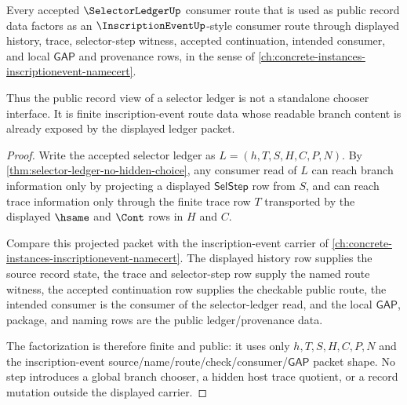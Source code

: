 \begin{theorem}
\label{thm:selector-ledger-inscription-event-consumer-route}
Every accepted $\SelectorLedgerUp$ consumer route that is used as public record data factors as an $\InscriptionEventUp$-style consumer route through displayed history, trace, selector-step witness, accepted continuation, intended consumer, and local $\mathsf{GAP}$ and provenance rows, in the sense of \autoref{ch:concrete-instances-inscriptionevent-namecert}.

Thus the public record view of a selector ledger is not a standalone chooser interface. It is finite inscription-event route data whose readable branch content is already exposed by the displayed ledger packet.
\end{theorem}
\begin{proof}
Write the accepted selector ledger as $L=(h,T,S,H,C,P,N)$. By \autoref{thm:selector-ledger-no-hidden-choice}, any consumer read of $L$ can reach branch information only by projecting a displayed $\mathsf{SelStep}$ row from $S$, and can reach trace information only through the finite trace row $T$ transported by the displayed $\hsame$ and $\Cont$ rows in $H$ and $C$.

Compare this projected packet with the inscription-event carrier of \autoref{ch:concrete-instances-inscriptionevent-namecert}. The displayed history row supplies the source record state, the trace and selector-step row supply the named route witness, the accepted continuation row supplies the checkable public route, the intended consumer is the consumer of the selector-ledger read, and the local $\mathsf{GAP}$, package, and naming rows are the public ledger/provenance data.

The factorization is therefore finite and public: it uses only $h,T,S,H,C,P,N$ and the inscription-event source/name/route/check/consumer/$\mathsf{GAP}$ packet shape. No step introduces a global branch chooser, a hidden host trace quotient, or a record mutation outside the displayed carrier.
\end{proof}


